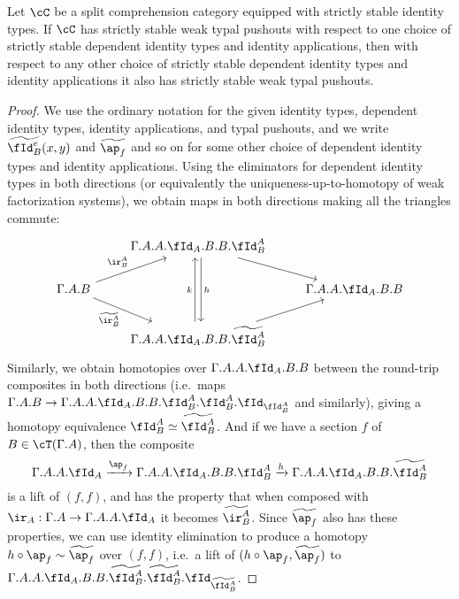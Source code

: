 \documentclass{amsart}
\let\C\cC
\let\T\cT
\let\r\ir
\let\Id\fId
\newcommand{\Idtwo}[2]{\widetilde{\Id^{#1}_{#2}}}
\newcommand{\rtwo}[2]{\widetilde{\r^{#1}_{#2}}}
\newcommand{\idovertwo}[4][]{\widetilde{\fId^{#4}_{#1}}(#2,#3)}
\newcommand{\aptwo}[1]{\widetilde{\ap_{#1}}}
\begin{document}
\begin{thm}\label{thm:transfer-depid}
  Let $\C$ be a split comprehension category equipped with strictly stable identity types.
  If $\C$ has strictly stable weak typal pushouts with respect to one choice of strictly stable dependent identity types and identity applications, then with respect to any other choice of strictly stable dependent identity types and identity applications it also has strictly stable weak typal pushouts.
\end{thm}
\begin{proof}
  We use the ordinary notation for the given identity types, dependent identity types, identity applications, and typal pushouts, and we write $\idovertwo[B]{x}{y}{e}$ and $\aptwo{f}$ and so on for some other choice of dependent identity types and identity applications.
  Using the eliminators for dependent identity types in both directions (or equivalently the uniqueness-up-to-homotopy of weak factorization systems), we obtain maps in both directions making all the triangles commute:
  \[
  \begin{tikzcd}
    & \Gamma.A.A.\Id_A.B.B.\Id^A_B \ar[dr] \ar[dd,shift left,"h"]\\
    \Gamma.A.B \ar[ur,"{\r^A_B}"] \ar[dr,swap,"{\rtwo{A}{B}}"] && \Gamma.A.A.\Id_A.B.B\\
    & \Gamma.A.A.\Id_A.B.B.\Idtwo{A}{B} \ar[ur] \ar[uu,shift left,"k"]
  \end{tikzcd}
  \]
  Similarly, we obtain homotopies over $\Gamma.A.A.\Id_A.B.B$ between the round-trip composites in both directions (i.e.\ maps $\Gamma.A.B \to \Gamma.A.A.\Id_A.B.B.\Id^A_B.\Id^A_B.\Id_{\Id^A_B}$ and similarly), giving a homotopy equivalence $\Id^A_B \simeq \Idtwo{A}{B}$.
  And if we have a section $f$ of $B\in\T(\Gamma.A)$, then the composite
  \[ \Gamma.A.A.\Id_A \xto{\ap_f} \Gamma.A.A.\Id_A.B.B.\Id^A_B \xto{h} \Gamma.A.A.\Id_A.B.B.\Idtwo{A}{B} \]
  is a lift of $(f,f)$, and has the property that when composed with $\r_A : \Gamma.A \to \Gamma.A.A.\Id_A$ it becomes $\rtwo{A}{B}$.
  Since $\aptwo{f}$ also has these properties, we can use identity elimination to produce a homotopy $h\circ \ap_f \sim \aptwo{f}$ over $(f,f)$, i.e.\ a lift of $(h\circ \ap_f,\aptwo{f})$ to $\Gamma.A.A.\Id_A.B.B.\Idtwo{A}{B}.\Idtwo{A}{B}.\Id_{\Idtwo{A}{B}}$.


\end{proof}
\end{document}
